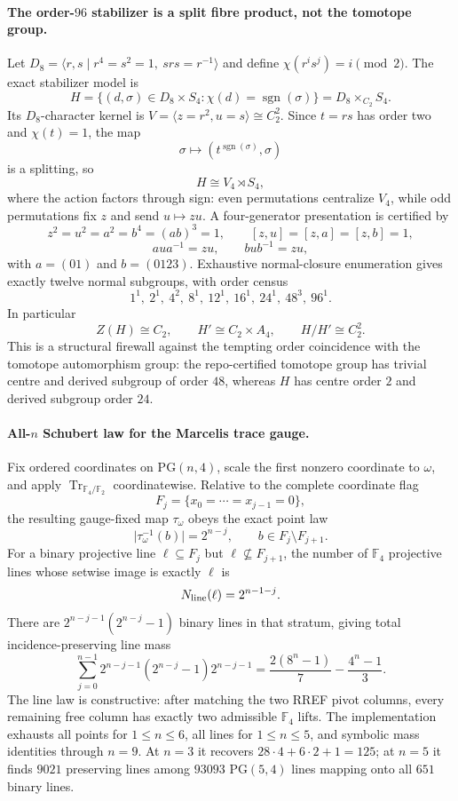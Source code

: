 \paragraph{The order-$96$ stabilizer is a split fibre product, not the tomotope group.}
Let $D_8=\langle r,s\mid r^4=s^2=1,\ srs=r^{-1}\rangle$ and define
$\chi(r^is^j)=i\pmod 2$.  The exact stabilizer model is
\[
H=\{(d,\sigma)\in D_8\times S_4:\chi(d)=\operatorname{sgn}(\sigma)\}
   =D_8\times_{C_2}S_4.
\]
Its $D_8$-character kernel is
$V=\langle z=r^2,u=s\rangle\cong C_2^2$.  Since $t=rs$ has order two and
$\chi(t)=1$, the map
\[
\sigma\longmapsto(t^{\operatorname{sgn}(\sigma)},\sigma)
\]
is a splitting, so
\[
H\cong V_4\rtimes S_4,
\]
where the action factors through sign: even permutations centralize $V_4$,
while odd permutations fix $z$ and send $u\mapsto zu$.  A four-generator
presentation is certified by
\[
z^2=u^2=a^2=b^4=(ab)^3=1,
\qquad [z,u]=[z,a]=[z,b]=1,
\]
\[
aua^{-1}=zu,\qquad bub^{-1}=zu,
\]
with $a=(01)$ and $b=(0123)$.  Exhaustive normal-closure enumeration gives
exactly twelve normal subgroups, with order census
\[
1^1,\ 2^1,\ 4^2,\ 8^1,\ 12^1,\ 16^1,\ 24^1,\ 48^3,\ 96^1.
\]
In particular
\[
Z(H)\cong C_2,\qquad H'\cong C_2\times A_4,
\qquad H/H'\cong C_2^2.
\]
This is a structural firewall against the tempting order coincidence with the
tomotope automorphism group: the repo-certified tomotope group has trivial
centre and derived subgroup of order $48$, whereas $H$ has centre order $2$
and derived subgroup order $24$.

\paragraph{All-$n$ Schubert law for the Marcelis trace gauge.}
Fix ordered coordinates on $\mathrm{PG}(n,4)$, scale the first nonzero coordinate to
$\omega$, and apply $\operatorname{Tr}_{\mathbb F_4/\mathbb F_2}$ coordinatewise.
Relative to the complete coordinate flag
\[
F_j=\{x_0=\cdots=x_{j-1}=0\},
\]
the resulting gauge-fixed map $\tau_\omega$ obeys the exact point law
\[
\bigl|\tau_\omega^{-1}(b)\bigr|=2^{n-j},
\qquad b\in F_j\setminus F_{j+1}.
\]
For a binary projective line $\ell\subseteq F_j$ but
$\ell\nsubseteq F_{j+1}$, the number of $\mathbb F_4$ projective lines whose
setwise image is exactly $\ell$ is
\[
N_{\rm line}(\ell)=2^{n-1-j}.
\]
There are $2^{n-j-1}(2^{n-j}-1)$ binary lines in that stratum, giving total
incidence-preserving line mass
\[
\sum_{j=0}^{n-1}2^{n-j-1}(2^{n-j}-1)2^{n-j-1}
=
\frac{2(8^n-1)}7-\frac{4^n-1}{3}.
\]
The line law is constructive: after matching the two RREF pivot columns, every
remaining free column has exactly two admissible $\mathbb F_4$ lifts.  The
implementation exhausts all points for $1\le n\le6$, all lines for
$1\le n\le5$, and symbolic mass identities through $n=9$.  At $n=3$ it
recovers $28\cdot4+6\cdot2+1=125$; at $n=5$ it finds $9021$ preserving lines
among $93093$ $\mathrm{PG}(5,4)$ lines mapping onto all $651$ binary lines.

